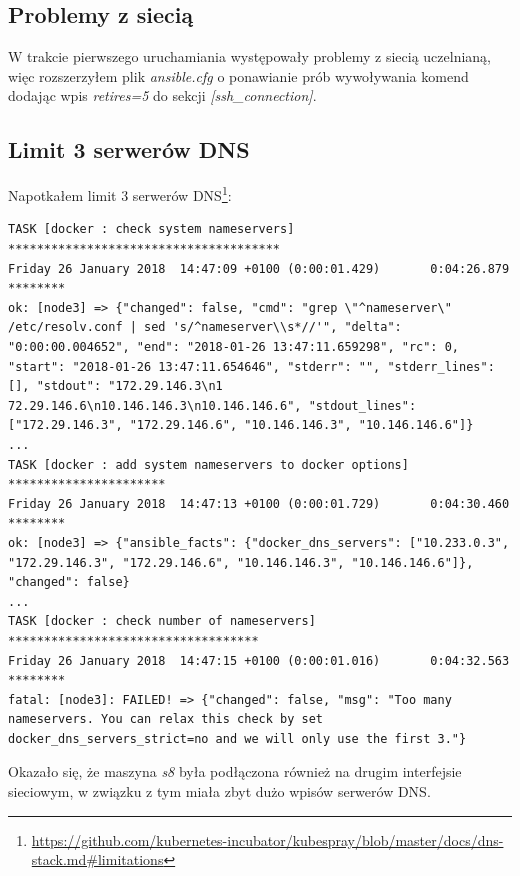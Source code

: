 \documentclass[a4paper,12pt,twoside,openany]{report}
\DeclareRobustCommand{\href}[2]{#2\footnote{\url{#1}}}
\begin{document}
\hypertarget{problemy-z-sieciux105}{%
\subsection{Problemy z siecią}\label{problemy-z-sieciux105}}

W trakcie pierwszego uruchamiania występowały problemy z siecią
uczelnianą, więc rozszerzyłem plik \emph{ansible.cfg} o ponawianie prób
wywoływania komend dodając wpis \emph{retires=5} do sekcji
\emph{{[}ssh\_connection{]}}.

\hypertarget{limit-3-serweruxf3w-dns}{%
\subsection{Limit 3 serwerów DNS}\label{limit-3-serweruxf3w-dns}}

Napotkałem
\href{https://github.com/kubernetes-incubator/kubespray/blob/master/docs/dns-stack.md\#limitations}{limit
3 serwerów DNS}:

\begin{lstlisting}
TASK [docker : check system nameservers] **************************************
Friday 26 January 2018  14:47:09 +0100 (0:00:01.429)       0:04:26.879 ******** 
ok: [node3] => {"changed": false, "cmd": "grep \"^nameserver\" /etc/resolv.conf | sed 's/^nameserver\\s*//'", "delta": "0:00:00.004652", "end": "2018-01-26 13:47:11.659298", "rc": 0, "start": "2018-01-26 13:47:11.654646", "stderr": "", "stderr_lines": [], "stdout": "172.29.146.3\n1
72.29.146.6\n10.146.146.3\n10.146.146.6", "stdout_lines": ["172.29.146.3", "172.29.146.6", "10.146.146.3", "10.146.146.6"]}
...
TASK [docker : add system nameservers to docker options] **********************
Friday 26 January 2018  14:47:13 +0100 (0:00:01.729)       0:04:30.460 ******** 
ok: [node3] => {"ansible_facts": {"docker_dns_servers": ["10.233.0.3", "172.29.146.3", "172.29.146.6", "10.146.146.3", "10.146.146.6"]}, "changed": false}
...
TASK [docker : check number of nameservers] ***********************************
Friday 26 January 2018  14:47:15 +0100 (0:00:01.016)       0:04:32.563 ******** 
fatal: [node3]: FAILED! => {"changed": false, "msg": "Too many nameservers. You can relax this check by set docker_dns_servers_strict=no and we will only use the first 3."}
\end{lstlisting}

Okazało się, że maszyna \emph{s8} była podłączona również na drugim
interfejsie sieciowym, w związku z tym miała zbyt dużo wpisów serwerów
DNS.
\end{document}
